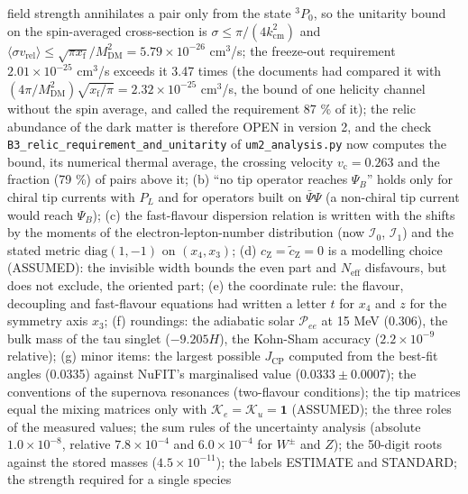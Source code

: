 \documentclass[
  10pt,
]{article}
\begin{document}
\begin{enumerate}
  field strength annihilates a pair only from the state \(^3P_0\), so
  the unitarity bound on the spin-averaged cross-section is
  \(\sigma \le \pi/(4k_{\mathrm{cm}}^2)\) and
  \(\langle\sigma v_{\mathrm{rel}}\rangle \le \sqrt{\pi x_{\mathrm{f}}}/M_{\mathrm{DM}}^2 = 5.79\times10^{-26}\)
  cm\(^3\)/s; the freeze-out requirement \(2.01\times10^{-25}\)
  cm\(^3\)/s exceeds it 3.47 times (the documents had compared it with
  \((4\pi/M_{\mathrm{DM}}^2)\sqrt{x_{\mathrm{f}}/\pi} = 2.32\times10^{-25}\)
  cm\(^3\)/s, the bound of one helicity channel without the spin
  average, and called the requirement 87 \% of it); the relic abundance
  of the dark matter is therefore OPEN in version 2, and the check
  \texttt{B3\_relic\_requirement\_and\_unitarity} of
  \texttt{um2\_analysis.py} now computes the bound, its numerical
  thermal average, the crossing velocity \(v_{\mathrm{c}} = 0.263\) and
  the fraction (79 \%) of pairs above it; (b) ``no tip operator reaches
  \(\Psi_B\)'' holds only for chiral tip currents with \(P_L\) and for
  operators built on \(\bar\Psi\Psi\) (a non-chiral tip current would
  reach \(\Psi_B\)); (c) the fast-flavour dispersion relation is written
  with the shifts by the moments of the electron-lepton-number
  distribution (now \(\mathcal{I}_0\), \(\mathcal{I}_1\)) and the stated
  metric \(\mathrm{diag}(1, -1)\) on \((x_4, x_3)\); (d)
  \(c_{\mathrm{Z}} = \tilde c_{\mathrm{Z}} = 0\) is a modelling choice
  (ASSUMED): the invisible width bounds the even part and
  \(N_{\mathrm{eff}}\) disfavours, but does not exclude, the oriented
  part; (e) the coordinate rule: the flavour, decoupling and
  fast-flavour equations had written a letter \(t\) for \(x_4\) and
  \(z\) for the symmetry axis \(x_3\); (f) roundings: the adiabatic
  solar \(\mathcal{P}_{ee}\) at 15 MeV (0.306), the bulk mass of the tau
  singlet (\(-9.205H\)), the Kohn-Sham accuracy (\(2.2\times10^{-9}\)
  relative); (g) minor items: the largest possible \(J_{\mathrm{CP}}\)
  computed from the best-fit angles (0.0335) against NuFIT's
  marginalised value (\(0.0333 \pm 0.0007\)); the conventions of the
  supernova resonances (two-flavour conditions); the tip matrices equal
  the mixing matrices only with
  \(\mathcal{K}_e = \mathcal{K}_u = \mathbf{1}\) (ASSUMED); the three
  roles of the measured values; the sum rules of the uncertainty
  analysis (absolute \(1.0\times10^{-8}\), relative \(7.8\times10^{-4}\)
  and \(6.0\times10^{-4}\) for \(W^\pm\) and \(Z\)); the 50-digit roots
  against the stored masses (\(4.5\times10^{-11}\)); the labels ESTIMATE
  and STANDARD; the strength required for a single species

\end{enumerate}
\end{document}
